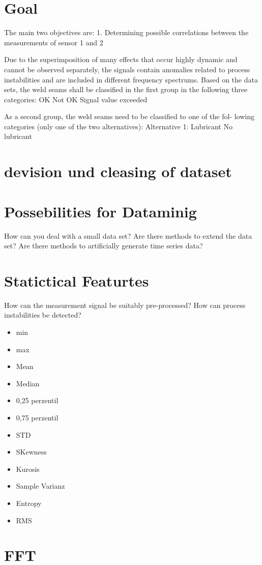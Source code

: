 \documentclass[12pt]{report}
\begin{document}
\section{Goal}
The main two objectives are:
1. Determining possible correlations between the measurements of
sensor 1 and 2

Due to the superimposition of many effects that occur highly dynamic and
cannot be observed separately, the signals contain anomalies related to
process instabilities and are included in different frequency spectrums.
Based on the data sets, the weld seams shall be classified in the first group
in the following three categories:
OK
Not OK
Signal value exceeded


As a second group, the weld seams need to be classified to one of the fol-
lowing categories (only one of the two alternatives):
Alternative 1:
Lubricant
No lubricant



\section{devision und cleasing of dataset}
\section{Possebilities for Dataminig}
How can you deal with a small data set? Are there methods to extend the
data set? Are there methods to artificially generate time series data?
\section{Statictical Featurtes}
How can the measurement signal be suitably pre-processed?
How can process instabilities be detected?
\begin{itemize}
	\item min
	\item max
	\item Mean
	\item Median
	\item 0,25 perzentil
	\item 0,75 perzentil
	\item STD
	\item SKewness 
	\item Kurosis 
	\item Sample Varianz
	\item Entropy
	\item RMS
\end{itemize}
\section{FFT}
\end{document}
